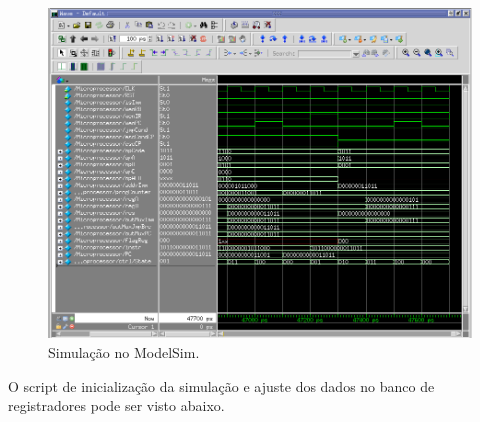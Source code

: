 \documentclass[11pt,a4paper,titlepage]{article}
\begin{document}
\begin{figure}[h]
\centering
\includegraphics[scale=0.55]{images/simulation.png}
\caption{Simulação no ModelSim.}
\label{fig:simulation}
\end{figure}

O script de inicialização da simulação e ajuste dos dados no banco de registradores pode ser visto abaixo.
\end{document}

